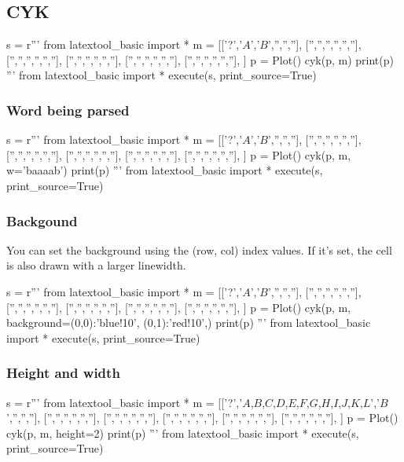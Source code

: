 \subsection{CYK}

\begin{python}
s = r'''
from latextool_basic import *
m = [['?','$A$','$B$','','',''],
     ['','','','','',''],
     ['','','','','',''],
     ['','','','','',''],
     ['','','','','',''],
     ['','','','','',''],
     ]
p = Plot()
cyk(p, m)
print(p)
'''
from latextool_basic import *
execute(s, print_source=True)
\end{python}


\subsubsection{Word being parsed}
\begin{python}
s = r'''
from latextool_basic import *
m = [['?','$A$','$B$','','',''],
     ['','','','','',''],
     ['','','','','',''],
     ['','','','','',''],
     ['','','','','',''],
     ['','','','','',''],
     ]
p = Plot()
cyk(p, m, w='baaaab')
print(p)
'''
from latextool_basic import *
execute(s, print_source=True)
\end{python}


\subsubsection{Backgound}
You can set the background using the (row, col)
index values.
If it's set, the cell is also drawn with a larger
linewidth.
\begin{python}
s = r'''
from latextool_basic import *
m = [['?','$A$','$B$','','',''],
     ['','','','','',''],
     ['','','','','',''],
     ['','','','','',''],
     ['','','','','',''],
     ['','','','','',''],
     ]
p = Plot()
cyk(p, m, background={(0,0):'blue!10',
                      (0,1):'red!10',})
print(p)
'''
from latextool_basic import *
execute(s, print_source=True)
\end{python}



\subsubsection{Height and width}
\begin{python}
s = r'''
from latextool_basic import *
m = [['?','$A$,$B$,$C$,$D$,$E$,$F$,$G$,$H$,$I$,$J$,$K$,$L$','$B$','','',''],
     ['','','','','',''],
     ['','','','','',''],
     ['','','','','',''],
     ['','','','','',''],
     ['','','','','',''],
     ]
p = Plot()
cyk(p, m, height=2)
print(p)
'''
from latextool_basic import *
execute(s, print_source=True)
\end{python}



